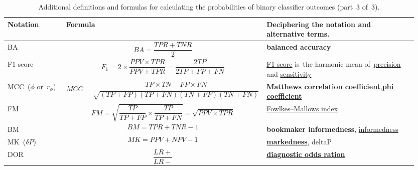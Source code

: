\documentclass[]{scrreprt}
\begin{document}
\begin{table}[ht]
	\caption{Additional definitions and formulas for calculating the probabilities of binary classifier outcomes (part~3 of~3).}\label{tab:ROC-rates-3}
	\tiny
	\begin{tabularx}{\textwidth}{p{0.15\linewidth} p{0.4\linewidth} p{0.4\linewidth}} 
		\hline
		Notation&Formula&Deciphering the notation and alternative terms.\\
		\hline
		BA&\begin{equation}\label{eq:BA}
		BA = \frac{TPR+TNR}{2}
		\end{equation}&\textbf{balanced accuracy}\\
		\hline
		F1 score&\begin{equation}\label{eq:F1-score}
		F_{1} = 2 \times \frac{PPV \times TPR}{PPV +TPR} = \frac{2TP}{2TP + FP + FN}
		\end{equation}&\href{https://en.wikipedia.org/wiki/F-score}{F1 score} is~the harmonic mean of~\href{https://en.wikipedia.org/wiki/Information_retrieval\#Precision}{precision} and \href{https://en.wikipedia.org/wiki/Sensitivity_(test)}{sensitivity}~\cite{Wiki:F-score}\\
		\hline
		MCC~($\phi$ or~$r_{\phi}$)&\begin{equation}\label{eq:MCC}
		MCC = \frac{TP \times TN - FP \times FN}{\sqrt{(TP+FP)(TP+FN)(TN+FP)(TN+FN)}}
		\end{equation}&\href{https://en.wikipedia.org/wiki/Phi_coefficient}{\textbf{Matthews correlation coefficient}},\href{https://en.wikipedia.org/wiki/Phi_coefficient}{\textbf{phi coefficient}}~\cite{Wiki:phi-coefficient}\\
		\hline
		FM&\begin{equation}\label{eq:FM}
		FM = \sqrt{\dfrac{TP}{TP+FP} \times \dfrac{TP}{TP+FN}} = \sqrt{PPV \times TPR}
		\end{equation}&\href{https://en.wikipedia.org/wiki/Fowlkes–Mallows_index}{Fowlkes–Mallows index}~\cite{Wiki:Fowlkes–Mallows-index}\\
		\hline
		BM&\begin{equation}\label{eq:BM}
		BM = TPR + TNR -1
		\end{equation}&\textbf{bookmaker informedness}, \href{https://en.wikipedia.org/wiki/Youden's_J_statistic}{informedness}~\cite{Wiki:j-statistic}\\
		\hline
		MK~($\delta P$)&\begin{equation}\label{eq:MK}
		MK = PPV + NPV - 1
		\end{equation}&\href{https://en.wikipedia.org/wiki/Markedness}{\textbf{markedness}}, deltaP~\cite{Wiki:markedness}\\
		\hline
		DOR&\begin{equation}\label{eq:DOR}
		\frac{LR+}{LR-}
		\end{equation}&\href{https://en.wikipedia.org/wiki/Diagnostic_odds_ratio}{\textbf{diagnostic odds ration}}~\cite{Wiki:DOR}\\
		\hline
	\end{tabularx}
	\normalsize
\end{table}
\end{document}
